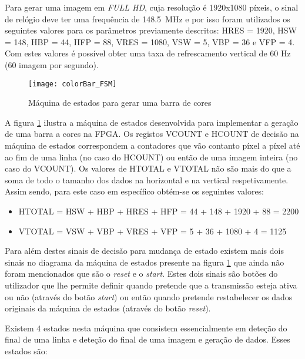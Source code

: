 Para gerar uma imagem em \textit{FULL HD}, cuja resolução é 1920x1080 píxeis, o sinal de relógio deve ter uma frequência de \SI{148.5}{\mega\hertz} e por isso foram utilizados os seguintes valores para os parâmetros previamente descritos: HRES = 1920, HSW = 148, HBP = 44, HFP = 88,  VRES = 1080, VSW = 5, VBP = 36 e VFP = 4. Com estes valores é possível obter uma taxa de refrescamento vertical de 60 Hz (60 imagem por segundo).

\begin{figure}[h!]
	\begin{center}
		\leavevmode
		\texttt{[image: colorBar\_FSM]}
		\caption{Máquina de estados para gerar uma barra de cores}
		\label{fig:colorBar_fsm}
	\end{center}
\end{figure}

A figura \ref{fig:colorBar_fsm} ilustra a máquina de estados desenvolvida para implementar a geração de uma barra a cores na FPGA. Os registos VCOUNT e HCOUNT de decisão na máquina de estados correspondem a contadores que vão contanto píxel a píxel até ao fim de uma linha (no caso do HCOUNT) ou então de uma imagem inteira (no caso do VCOUNT). Os valores de HTOTAL e VTOTAL não são mais do que a soma de todo o tamanho dos dados na horizontal e na vertical respetivamente. Assim sendo, para este caso em específico obtém-se os seguintes valores:
\begin{itemize}
	\item HTOTAL = HSW + HBP + HRES + HFP = 44 + 148 + 1920 + 88 = 2200
	\item VTOTAL = VSW + VBP + VRES + VFP = 5 + 36 + 1080 + 4 = 1125
\end{itemize}


Para além destes sinais de decisão para mudança de estado existem mais dois sinais no diagrama da máquina de estados presente na figura \ref{fig:colorBar_fsm} que ainda não foram mencionados que são o \textit{reset} e o \textit{start}. Estes dois sinais são botões do utilizador que lhe permite definir quando pretende que a transmissão esteja ativa ou não (através do botão \textit{start}) ou então quando pretende restabelecer os dados originais da máquina de estados (através do botão \textit{reset}). 


Existem 4 estados nesta máquina que consistem essencialmente em deteção do final de uma linha e deteção do final de uma imagem e geração de dados. Esses estados são:


